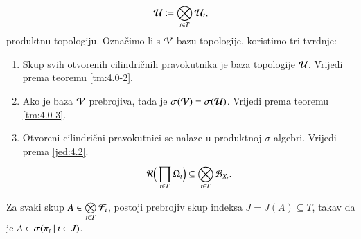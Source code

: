 \begin{rj}[\ref{zad:4.4}]
\begin{enumerate}
        \begin{equation*}
            \mathcal{U} := \bigotimes\limits_{t \in T}^{} \mathcal{U}_t,
        \end{equation*}
        produktnu topologiju.
        Ozna\v cimo li s $\mathcal{V}$ bazu topologije, koristimo tri tvrdnje:
        \begin{enumerate}[label=(\arabic*)]
            \item Skup svih otvorenih cilindri\v cnih pravokutnika je baza topologije $\mathcal{U}$.
            Vrijedi prema teoremu \ref{tm:4.0-2}.
            \item Ako je baza $\mathcal{V}$ prebrojiva, tada je $\sigma({\mathcal{V}}) = \sigma({\mathcal{U}})$.
            Vrijedi prema teoremu \ref{tm:4.0-3}.
            \item Otvoreni cilindri\v cni pravokutnici se nalaze u produktnoj $\sigma$-algebri.
            Vrijedi prema \eqref{jed:4.2}.
            \begin{equation*}
                \mathcal{R} \Big( \prod\limits_{t \in T}^{} \Omega_t \Big) \subseteq \bigotimes\limits_{t \in T}^{} \mathcal{B}_{X_t}.
            \end{equation*}
        \end{enumerate}
    \end{enumerate}
\end{rj}

\begin{zad} \label{zad:4.6}
    Za svaki skup $A \in \bigotimes\limits_{t \in T}^{} \mathcal{F}_t$, postoji prebrojiv skup indeksa $J = J(A) \subseteq T$, takav da je $A \in \sigma({\pi_t} \: | \: {t \in J})$. 
\end{zad}

